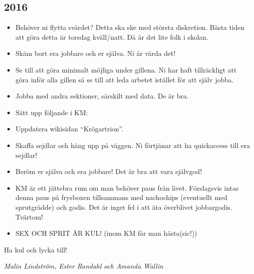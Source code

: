\documentclass[10pt]{article}
\begin{document}
\subsection{2016}
\begin{itemize}
	\item Behöver ni flytta svärdet? Detta ska ske med största diskretion. Bästa tiden att
göra detta är torsdag kväll/natt. Då är det lite folk i skolan.
	\item Skäm bort era jobbare och er själva. Ni är värda det!
    \item Se till att göra minimalt möjliga under gillena. Ni har haft tillräckligt att göra inför alla gillen så se till att leda arbetet istället för att själv jobba.
    \item Jobba med andra sektioner, särskilt med data. De är bra.
    \item Sätt upp följande i KM:
    \item Uppdatera wikisidan “Krögartrion”.
    \item Skaffa sejdlar och häng upp på väggen. Ni förtjänar att ha quickaccess till era
sejdlar!
	\item Beröm er själva och era jobbare! Det är bra att vara självgod!
    \item KM är ett jättebra rum om man behöver paus från livet. Förslagsvis intas denna
paus på frysboxen tillsammans med nachochips (eventuellt med sprutgrädde)
och godis. Det är inget fel i att äta överblivet jobbargodis. Tvärtom!
	\item SEX OCH SPRIT ÄR KUL! (inom KM får man hästa(sic!))
\end{itemize}
Ha kul och lycka till!

\textit{Malin Lindström, Ester Randahl och Amanda Wallin}
\end{document}
